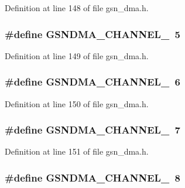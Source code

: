 Definition at line 148 of file gsn\_\-dma.h.

\hypertarget{a00484_a3fdf644bda1e436a4d3278ad1b69efe0}{
\subsubsection[{GSNDMA\_\-CHANNEL\_\-5}]{\setlength{\rightskip}{0pt plus 5cm}\#define GSNDMA\_\-CHANNEL\_~5}}
\label{a00484_a3fdf644bda1e436a4d3278ad1b69efe0}


Definition at line 149 of file gsn\_\-dma.h.

\hypertarget{a00484_a60b20ca60701a2e09dbaa2e35205c63d}{
\subsubsection[{GSNDMA\_\-CHANNEL\_\-6}]{\setlength{\rightskip}{0pt plus 5cm}\#define GSNDMA\_\-CHANNEL\_~6}}
\label{a00484_a60b20ca60701a2e09dbaa2e35205c63d}


Definition at line 150 of file gsn\_\-dma.h.

\hypertarget{a00484_a1dc12024a1645e9628a8228eb3d600fc}{
\subsubsection[{GSNDMA\_\-CHANNEL\_\-7}]{\setlength{\rightskip}{0pt plus 5cm}\#define GSNDMA\_\-CHANNEL\_~7}}
\label{a00484_a1dc12024a1645e9628a8228eb3d600fc}


Definition at line 151 of file gsn\_\-dma.h.

\hypertarget{a00484_a59184a849d87060a1aa4af080be777bc}{
\subsubsection[{GSNDMA\_\-CHANNEL\_\-8}]{\setlength{\rightskip}{0pt plus 5cm}\#define GSNDMA\_\-CHANNEL\_~8}}
\label{a00484_a59184a849d87060a1aa4af080be777bc}


